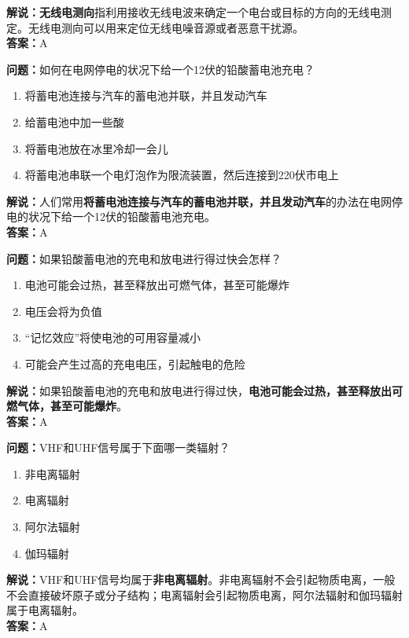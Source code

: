 \textbf{解说：无线电测向}指利用接收无线电波来确定一个电台或目标的方向的无线电测定。无线电测向可以用来定位无线电噪音源或者恶意干扰源。\\\textbf{答案：}A%


\textbf{问题：}如何在电网停电的状况下给一个12伏的铅酸蓄电池充电？

\begin{enumerate}[label=\Alph*), leftmargin=1cm]
	\item 将蓄电池连接与汽车的蓄电池并联，并且发动汽车
	\item 给蓄电池中加一些酸
	\item 将蓄电池放在冰里冷却一会儿
	\item 将蓄电池串联一个电灯泡作为限流装置，然后连接到220伏市电上
\end{enumerate}

\textbf{解说：}人们常用\textbf{将蓄电池连接与汽车的蓄电池并联，并且发动汽车}的办法在电网停电的状况下给一个12伏的铅酸蓄电池充电。\\\textbf{答案：}A%


\textbf{问题：}如果铅酸蓄电池的充电和放电进行得过快会怎样？

\begin{enumerate}[label=\Alph*), leftmargin=1cm]
	\item 电池可能会过热，甚至释放出可燃气体，甚至可能爆炸
	\item 电压会将为负值
	\item “记忆效应”将使电池的可用容量减小
	\item 可能会产生过高的充电电压，引起触电的危险
\end{enumerate}

\textbf{解说：}如果铅酸蓄电池的充电和放电进行得过快，\textbf{电池可能会过热，甚至释放出可燃气体，甚至可能爆炸}。\\\textbf{答案：}A%


\textbf{问题：}VHF和UHF信号属于下面哪一类辐射？

\begin{enumerate}[label=\Alph*), leftmargin=1cm]
	\item 非电离辐射
	\item 电离辐射
	\item 阿尔法辐射
	\item 伽玛辐射
\end{enumerate}

\textbf{解说：}VHF和UHF信号均属于\textbf{非电离辐射}。非电离辐射不会引起物质电离，一般不会直接破坏原子或分子结构；电离辐射会引起物质电离，阿尔法辐射和伽玛辐射属于电离辐射。\\\textbf{答案：}A%
